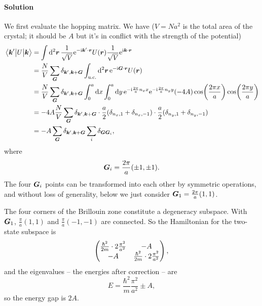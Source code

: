 \documentclass[hyperref, a4paper]{article}
\newcommand*{\ii}{\mathrm{i}}
\newcommand*{\ee}{\mathrm{e}}
\begin{document}
\paragraph{Solution} We first evaluate the hopping matrix.
We have ($V = N a^2$ is the total area of the crystal; 
it should be $A$ but it's in conflict with the strength of the potential)
\begin{equation}
    \begin{aligned}
        \mel{\vb*{k}'}{U}{\vb*{k}} 
        &= \int \dd[2]{\vb*{r}} \frac{1}{\sqrt{V}} \ee^{- \ii \vb*{k}' \cdot \vb*{r}} U(\vb*{r}) 
        \frac{1}{\sqrt{V}} \ee^{\ii \vb*{k} \cdot \vb*{r}} \\
        &= \frac{N}{V} \sum_{\vb*{G}} \delta_{\vb*{k}', \vb*{k} + \vb*{G}}
        \int_{\text{u.c.}} \dd[2]{\vb*{r}} \ee^{- \ii \vb*{G} \cdot \vb*{r}} U(\vb*{r}) \\
        &= \frac{N}{V} \sum_{\vb*{G}} \delta_{\vb*{k}', \vb*{k} + \vb*{G}}
        \int_0^a \dd{x} \int_0^a \dd{y} \ee^{- \ii \frac{2\pi}{a} n_x x} \ee^{- \ii \frac{2\pi}{a} n_y y}
        (-4 A) \cos(\frac{2\pi x}{a}) \cos(\frac{2\pi y}{a}) \\
        &= - 4 A \frac{N}{V} \sum_{\vb*{G}} \delta_{\vb*{k}', \vb*{k} + \vb*{G}} 
        \cdot \frac{a}{2} (\delta_{n_x, 1} + \delta_{n_x, -1}) 
        \cdot \frac{a}{2} (\delta_{n_y, 1} + \delta_{n_y, -1}) \\
        &= - A \sum_{\vb*{G}} \delta_{\vb*{k}', \vb*{k} + \vb*{G}} \sum_i \delta_{\vb*{G} \vb*{G}_i},
    \end{aligned}
\end{equation}
where 
\begin{equation}
    \vb*{G}_i = \frac{2\pi}{a} (\pm 1, \pm 1). 
\end{equation}
The four $\vb*{G}_i$ points can be transformed into each other by symmetric operations,
and without loss of generality,
below we just consider $\vb*{G}_1 = \frac{2\pi}{a} (1, 1)$.

The four corners of the Brillouin zone constitute a degeneracy subspace.
With $\vb*{G}_1$, 
$\frac{\pi}{a} (1, 1)$ and $\frac{\pi}{a} (-1, -1)$ are connected.
So the Hamiltonian for the two-state subspace is 
\begin{equation}
    \pmqty{
        \frac{\hbar^2}{2m} \cdot 2 \frac{\pi^2}{a^2} & - A \\
        - A & \frac{\hbar^2}{2m} \cdot 2 \frac{\pi^2}{a^2} 
    },
\end{equation}
and the eigenvalues -- the energies after correction -- are 
\begin{equation}
    E = \frac{\hbar^2}{m} \frac{\pi^2}{a^2} \pm A,
\end{equation}
so the energy gap is $2A$.
\end{document}
